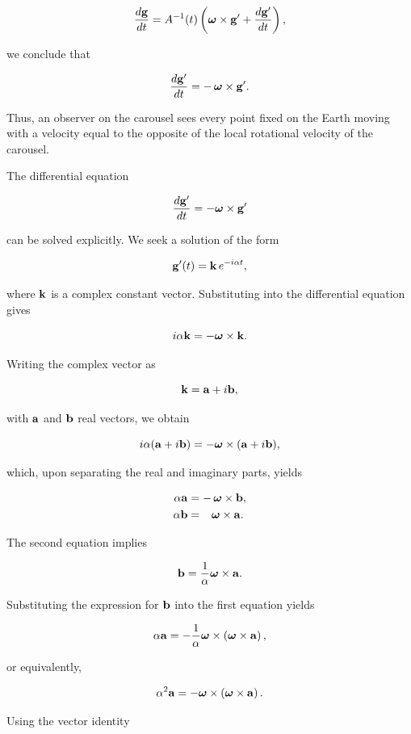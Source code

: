 \documentclass[12pt]{article}
\begin{document}
\[
  \frac{d\vb g}{dt}
  =
  A^{-1}(t)
  \left(
    \boldsymbol{\omega}\times\vb g'
    +
    \frac{d\vb g'}{dt}
  \right),
\]

we conclude that

\[
  \frac{d\vb g'}{dt}
  =
  -\,\boldsymbol{\omega}\times\vb g'.
\]

Thus, an observer on the carousel sees every point fixed on the Earth moving
with a velocity equal to the opposite of the local rotational velocity of the
carousel.

The differential equation

\[
  \frac{d\vb g'}{dt}
  =
  -\boldsymbol{\omega}\times\vb g'
\]

can be solved explicitly. We seek a solution of the form

\[
  \vb g'(t)
  =
  \vb k\,e^{-i\alpha t},
\]

where $\vb k$ is a complex constant vector. Substituting into the differential
equation gives

\[
  i\alpha\vb k
  =
  -\boldsymbol{\omega}\times\vb k.
\]

Writing the complex vector as

\[
  \vb k
  =
  \vb a+i\vb b,
\]

with $\vb a$ and $\vb b$ real vectors, we obtain

\[
  i\alpha(\vb a+i\vb b)
  =
  -\boldsymbol{\omega}\times(\vb a+i\vb b),
\]

which, upon separating the real and imaginary parts, yields

\[
\begin{aligned}
  \alpha\vb a &= -\,\boldsymbol{\omega}\times\vb b,
  \\
  \alpha\vb b &= \phantom{-}\boldsymbol{\omega}\times\vb a.
\end{aligned}
\]

The second equation implies

\[
  \vb b
  =
  \frac{1}{\alpha}
  \boldsymbol{\omega}\times\vb a.
\]

 Substituting the expression for $\vb b$ into the first equation yields

\[
  \alpha\vb a
  =
  -\frac{1}{\alpha}
  \boldsymbol{\omega}\times
  \left(
    \boldsymbol{\omega}\times\vb a
  \right),
\]

or equivalently,

\[
  \alpha^2\vb a
  =
  -\boldsymbol{\omega}\times
  \left(
    \boldsymbol{\omega}\times\vb a
  \right).
\]

Using the vector identity
\end{document}
